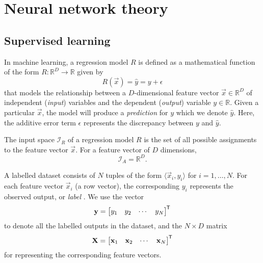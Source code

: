 \chapter{Neural network theory}
\section{Supervised learning}

\begin{definition}
    \label{def:reg_model}
    In machine learning, a regression model $R$ is defined as a mathematical function of the form $R:\mathbb{R}^D\rightarrow \mathbb{R}$ given by
    \begin{equation}
        \label{eq:reg_model}
        R(\vec{x}) = \hat{y} = y + \epsilon
    \end{equation}
    that models the relationship between a $D$-dimensional feature vector $\vec{x} \in \mathbb{R}^D$ of independent (\textit{input}) variables and the dependent (\textit{output}) variable $y \in \mathbb{R}$. 
    Given a particular $\vec{x}$, the model will produce a \textit{prediction} for $y$ which we denote $\hat{y}$.
    Here, the additive error term $\epsilon$ represents the discrepancy between $y$ and $\hat{y}$.
\end{definition}

\begin{definition}
    \label{def:input_space}
    The input space $\mathcal{I}_R$ of a regression model $R$ is the set of all possible assignments to the feature vector $\vec{x}$.
    For a feature vector of $D$ dimensions,
    \begin{equation}
        \mathcal{I}_A=\mathbb{R}^D.
    \end{equation}
\end{definition}

\begin{definition}
    A labelled dataset consists of $N$ tuples of the form $\langle \vec{x}_i, y_i\rangle$ for $i=1,\dots,N$.
    For each feature vector $\vec{x}_i$ (a row vector), the corresponding $y_i$ represents the observed output, or \textit{label} \cite{burkov2019}.
    We use the vector
    \begin{equation}
        \label{eq:sup_learn_target}
        \mathbf{y} = \begin{bmatrix}
            y_1 & y_2 & \cdots & y_N
        \end{bmatrix}^{\mkern-1.5mu\mathsf{T}}
    \end{equation}
    to denote all the labelled outputs in the dataset, and the $N \times D$ matrix
    \begin{equation}
        \label{eq:sup_learn_input_matrix}
        \mathbf{X} = \begin{bmatrix}
            \mathbf{x}_1 & \mathbf{x}_2 & \cdots & \mathbf{x}_N
        \end{bmatrix}^{\mkern-1.5mu\mathsf{T}}
    \end{equation}
    for representing the corresponding feature vectors.
\end{definition}

